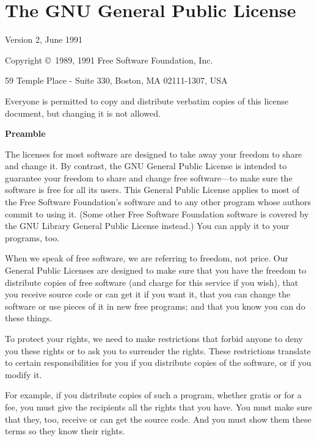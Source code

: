 \documentclass{article}
\begin{document}
\section{The GNU General Public License}


\begin{center}
{\parindent 0in

Version 2, June 1991

Copyright \copyright\ 1989, 1991 Free Software Foundation, Inc.

\bigskip

59 Temple Place - Suite 330, Boston, MA  02111-1307, USA

\bigskip

Everyone is permitted to copy and distribute verbatim copies
of this license document, but changing it is not allowed.
}
\end{center}

\begin{center}
{\bf\large Preamble}
\end{center}


The licenses for most software are designed to take away your freedom to
share and change it.  By contrast, the GNU General Public License is
intended to guarantee your freedom to share and change free software---to
make sure the software is free for all its users.  This General Public
License applies to most of the Free Software Foundation's software and to
any other program whose authors commit to using it.  (Some other Free
Software Foundation software is covered by the GNU Library General Public
License instead.)  You can apply it to your programs, too.

When we speak of free software, we are referring to freedom, not price.
Our General Public Licenses are designed to make sure that you have the
freedom to distribute copies of free software (and charge for this service
if you wish), that you receive source code or can get it if you want it,
that you can change the software or use pieces of it in new free programs;
and that you know you can do these things.

To protect your rights, we need to make restrictions that forbid anyone to
deny you these rights or to ask you to surrender the rights.  These
restrictions translate to certain responsibilities for you if you
distribute copies of the software, or if you modify it.

For example, if you distribute copies of such a program, whether gratis or
for a fee, you must give the recipients all the rights that you have.  You
must make sure that they, too, receive or can get the source code.  And
you must show them these terms so they know their rights.
\end{document}
